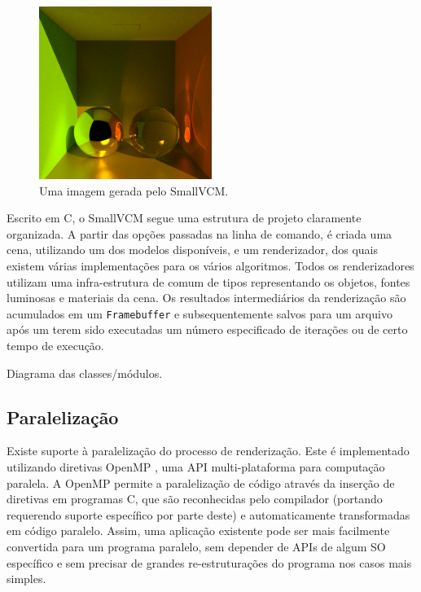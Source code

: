 \documentclass[tg]{mdtufsm}
\def\Cpp{{C\nolinebreak[4]\raisebox{.20ex}{\small\bf++}}}
\newcommand{\todo}[1]{\textsf{\color{red}#1}}
\begin{document}
\begin{figure}
	\centering
	\includegraphics[width=0.5\textwidth]{ggbs_s_vcm}
	\caption{
		Uma imagem gerada pelo SmallVCM.
	}
	\label{fig:smallvcm_img}
\end{figure}

Escrito em \Cpp, o SmallVCM segue uma estrutura de projeto claramente organizada. A partir das opções passadas na linha de comando, é criada uma cena, utilizando um dos modelos disponíveis, e um renderizador, dos quais existem várias implementações para os vários algoritmos. Todos os renderizadores utilizam uma infra-estrutura de comum de tipos representando os objetos, fontes luminosas e materiais da cena. Os resultados intermediários da renderização são acumulados em um \texttt{Framebuffer} e subsequentemente salvos para um arquivo após um terem sido executadas um número especificado de iterações ou de certo tempo de execução.

\todo{Diagrama das classes/módulos.}

\subsection{Paralelização}

Existe suporte à paralelização do processo de renderização. Este é implementado utilizando diretivas OpenMP \citep{openmp40}, uma API multi-plataforma para computação paralela. A OpenMP permite a paralelização de código através da inserção de diretivas  em programas \Cpp, que são reconhecidas pelo compilador (portando requerendo suporte específico por parte deste) e automaticamente transformadas em código paralelo. Assim, uma aplicação existente pode ser mais facilmente convertida para um programa paralelo, sem depender de APIs de algum SO específico e sem precisar de grandes re-estruturações do programa nos casos mais simples.
\end{document}
